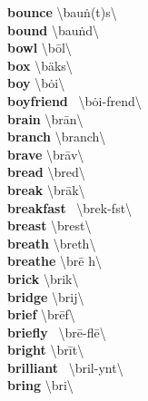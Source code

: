 \documentclass[10pt,a4paper]{article}
\begin{document}
\begin{multicols}{2}
\textbf{ bounce }\quad \textbackslash \textprimstress bau\. n(t)s\textbackslash \\
\textbf{ bound }\quad \textbackslash \textprimstress bau\. nd\textbackslash \\
\textbf{ bowl }\quad \textbackslash \textprimstress b\={o}l\textbackslash \\
\textbf{ box }\quad \textbackslash \textprimstress b\"{a}ks\textbackslash \\
\textbf{ boy }\quad \textbackslash \textprimstress b\.{o}i\textbackslash \\
\textbf{ boyfriend }\quad \ \textbackslash \textprimstress b\.{o}i-\textsecstress frend\textbackslash \\
\textbf{ brain }\quad \textbackslash \textprimstress br\={a}n\textbackslash \\
\textbf{ branch }\quad \textbackslash \textprimstress branch\textbackslash \\
\textbf{ brave }\quad \textbackslash \textprimstress br\={a}v\textbackslash \\
\textbf{ bread }\quad \textbackslash \textprimstress bred\textbackslash \\
\textbf{ break }\quad \textbackslash \textprimstress br\={a}k\textbackslash \\
\textbf{ breakfast }\quad \ \textbackslash \textprimstress brek-f\textschwa st\textbackslash \\
\textbf{ breast }\quad \textbackslash \textprimstress brest\textbackslash \\
\textbf{ breath }\quad \textbackslash \textprimstress breth\textbackslash \\
\textbf{ breathe }\quad \textbackslash \textprimstress br\={e} h\textbackslash \\
\textbf{ brick }\quad \textbackslash \textprimstress brik\textbackslash \\
\textbf{ bridge }\quad \textbackslash \textprimstress brij\textbackslash \\
\textbf{ brief }\quad \textbackslash \textprimstress br\={e}f\textbackslash \\
\textbf{ briefly }\quad \ \textbackslash \textprimstress br\={e}-fl\={e}\textbackslash \\
\textbf{ bright }\quad \textbackslash \textprimstress br\={i}t\textbackslash \\
\textbf{ brilliant }\quad \ \textbackslash \textprimstress bril-y\textschwa nt\textbackslash \\
\textbf{ bring }\quad \textbackslash \textprimstress bri\engma \textbackslash \\

\end{multicols}
\end{document}
